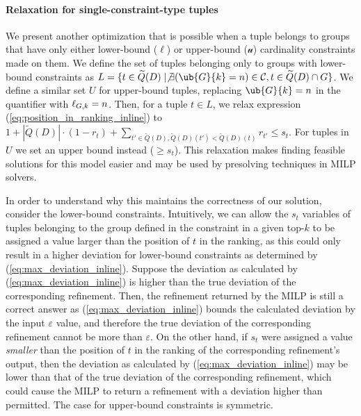\paragraph*{\textbf{Relaxation for single-constraint-type tuples}}
We present another optimization that is possible when a tuple belongs to groups that have only either lower-bound ($\ell$) or upper-bound ($\mathscr{u}$) cardinality constraints made on them. We define the set of tuples belonging only to groups with lower-bound constraints as 
$L = \{ t \in \widetilde{Q}(D) \mid \not\exists (\ub{G}{k} = n) \in \constraints, t \in \widetilde{Q}(D) \cap G \}$.
We define a similar set $U$ for upper-bound tuples, replacing $\ub{G}{k} = n$ in the quantifier with $\ell_{G, k} = n$. Then, for a tuple $t \in L$, we relax expression (\ref{eq:position_in_ranking_inline}) to 
$1 + |\widetilde{Q}(D)| \cdot (1 - r_t) + \sum_{t' \in \widetilde{Q}(D), \widetilde{Q}(D)(t') < \widetilde{Q}(D)(t)} r_{t'} \leq s_{t}$. For tuples in $U$ we set an upper bound instead ($\geq s_t$). This relaxation makes finding feasible solutions for this model easier and may be used by presolving techniques in MILP solvers.

In order to understand why this maintains the correctness of our solution, consider the lower-bound constraints. Intuitively, we can allow the $s_t$ variables of tuples belonging to the group defined in the constraint in a given top-$k$ to be assigned a value larger than the position of $t$ in the ranking, as this could only result in a higher deviation for lower-bound constraints as determined by (\ref{eq:max_deviation_inline}). Suppose the deviation as calculated by (\ref{eq:max_deviation_inline}) is higher than the true deviation of the corresponding refinement. Then, the refinement returned by the MILP is still a correct answer as (\ref{eq:max_deviation_inline}) bounds the calculated deviation by the input $\varepsilon$ value, and therefore the true deviation of the corresponding refinement cannot be more than $\varepsilon$. On the other hand, if $s_t$ were assigned a value {\it smaller} than the position of $t$ in the ranking of the corresponding refinement's output, then the deviation as calculated by (\ref{eq:max_deviation_inline}) may be lower than that of the true deviation of the corresponding refinement, which could cause the MILP to return a refinement with a deviation higher than permitted. 
The case for upper-bound constraints is symmetric.





